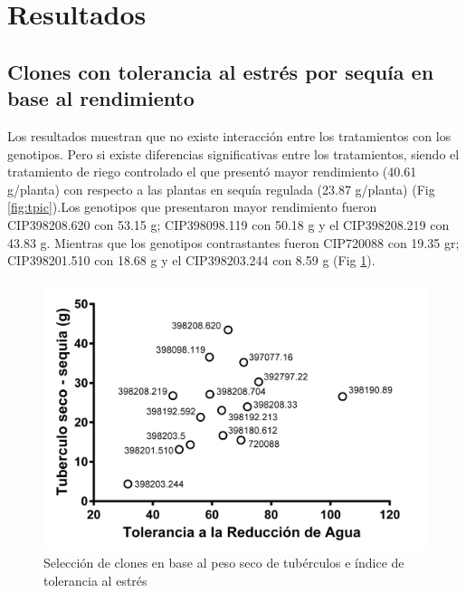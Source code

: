 \documentclass[fleqn,10pt]{Flavio}\usepackage[]{graphicx}\usepackage[]{color}
\begin{document}

\section{Resultados}

\subsection{Clones con tolerancia al estr\'es por sequ\'ia en base al rendimiento } 

Los resultados muestran que no existe interacci\'on entre los tratamientos con los genotipos. Pero si existe diferencias significativas entre los tratamientos, siendo el tratamiento de riego controlado el que present\'o mayor rendimiento (40.61 g/planta) con respecto a las plantas en sequ\'ia regulada (23.87 g/planta) (Fig \ref{fig:tpic}).Los genotipos que presentaron mayor rendimiento fueron CIP398208.620 con 53.15 g; CIP398098.119 con 50.18 g y el CIP398208.219 con 43.83 g. Mientras que los genotipos contrastantes fueron CIP720088 con 19.35 gr; CIP398201.510 con 18.68 g  y el CIP398203.244 con 8.59 g (Fig \ref{fig:yield}).

\begin{figure}[ht]\centering
\includegraphics[width=\linewidth]{Tuber-TRA}
\caption{Selecci\'on de clones en base al peso seco de tub\'erculos e \'indice de tolerancia al estr\'es}
\label{fig:yield}
\end{figure}
\end{document}
